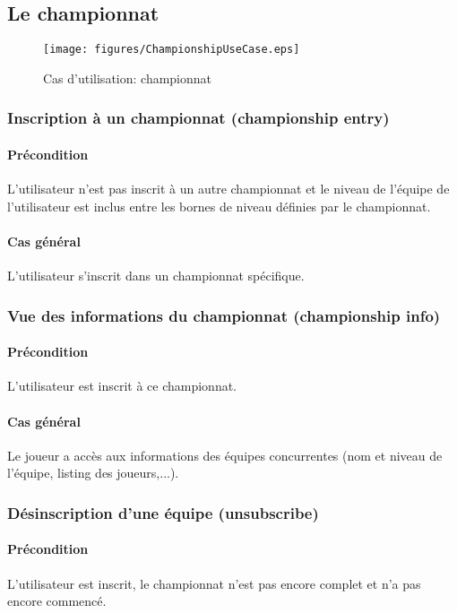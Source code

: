 \subsection{Le championnat}

\begin{figure}[h!]
  \centering
  \texttt{[image: figures/ChampionshipUseCase.eps]}
  \caption{\label{fig:UC:Championship} Cas d'utilisation: championnat}
\end{figure}

\subsubsection{Inscription à un championnat (championship entry)}
\paragraph{Précondition}
L'utilisateur n'est pas inscrit à un autre championnat et  le niveau de l'équipe de l'utilisateur est inclus entre les bornes de niveau définies par le championnat.
\paragraph{Cas général} L'utilisateur s'inscrit dans un championnat spécifique.

\subsubsection{Vue des informations du championnat (championship info)}
	\paragraph{Précondition} L'utilisateur est inscrit à ce championnat.
	\paragraph{Cas général} Le joueur a accès aux informations des équipes concurrentes 
		  (nom et niveau de l'équipe, listing des joueurs,...).

\subsubsection{Désinscription d'une équipe (unsubscribe)}
	\paragraph{Précondition} L'utilisateur est inscrit, le championnat n'est pas encore 
		  complet et n'a pas encore commencé.
